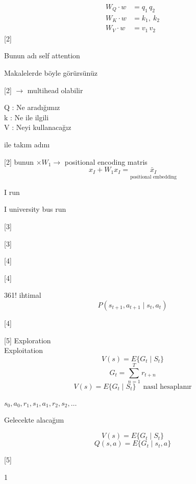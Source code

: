 \documentclass[11pt,a4paper]{article}
\begin{document}
\begin{align*}
W_Q \cdot w &= q_1\, q_2 \\
W_K \cdot w &= k_1,\ k_2 \\
W_V \cdot w &= v_1\, v_2
\end{align*}
[2]

Bunun adı self attention

Makalelerde böyle görürsünüz

[2]
$\rightarrow$ multihead olabilir

Q : Ne aradığımız\\
k : Ne ile ilgili\\
V : Neyi kullanacağız

 ile takım adını 

[2]
bunun $\times W_1 \rightarrow$ positional encoding matris
\[ x_I + W_1 x_I = \underset{\text{positional embedding}}{\bar{x}_I} \]

I run

I university bus run

[3]

[3]

[4]

[4]

361! ihtimal
\[ P(s_{t+1}, a_{t+1} \mid s_t, a_t) \]

[4]

[5]
Exploration\\
Exploitation\\
\[ V(s) = E\{G_t \mid S_t\} \]
\[ G_t = \sum_{n=1}^{T} r_{t+n} \]
\[ V(s) = E\{G_t \mid S_t\} \quad \text{nasıl hesaplanır} \]

$s_0, a_0, r_1, s_1, a_1, r_2, s_2, \dots$

Gelecekte alacağım 

\[ V(s) = E\{G_t \mid S_t\} \]
\[ Q(s,a) = E\{G_t \mid s_t, a\} \]

[5]

\textcircled{1}
\end{document}
